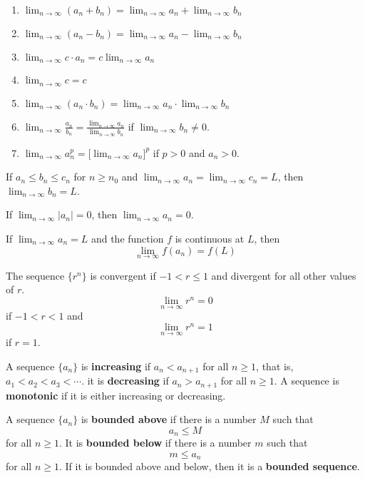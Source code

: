 \begin{enumerate}
    \item
    \(\displaystyle{\lim_{n\to\infty}(a_n+b_n)
    =\lim_{n\to\infty}a_n+\lim_{n\to\infty}b_n}\)
    \item
    \(\displaystyle{\lim_{n\to\infty}(a_n-b_n)
    =\lim_{n\to\infty}a_n-\lim_{n\to\infty}b_n}\)
    \item \(\displaystyle{\lim_{n\to\infty}c\cdot a_n=c\lim_{n\to\infty}a_n}\)
    \item \(\displaystyle{\lim_{n\to\infty}c=c}\)
    \item
    \(\displaystyle{\lim_{n\to\infty}(a_n\cdot b_n)
    =\lim_{n\to\infty}a_n\cdot\lim_{n\to\infty}b_n}\)
    \item
    \(\displaystyle{\lim_{n\to\infty}\frac{a_n}{b_n}
    =\frac{\displaystyle{\lim_{n\to\infty}a_n}}
    {\displaystyle{\lim_{n\to\infty}b_n}}}\)
    if \(\displaystyle{\lim_{n\to\infty}b_n\neq 0}\).
    \item
    \(\displaystyle{\lim_{n\to\infty}a_n^p=\big[\lim_{n\to\infty}a_n\big]^p}\)
    if \(p>0\) and \(a_n>0\).
\end{enumerate}
\begin{theorem}
    If \(a_n\leq b_n\leq c_n\) for \(n\geq n_0\) and
    \(\displaystyle{\lim_{n\to\infty}a_n=\lim_{n\to\infty}c_n}=L\), then
    \(\displaystyle{\lim_{n\to\infty}b_n=L}\).
\end{theorem}
\begin{theorem}
    If \(\displaystyle{\lim_{n\to\infty}|a_n|=0}\), then
    \(\displaystyle{\lim_{n\to\infty}a_n=0}\).
\end{theorem}
\begin{theorem}
    If \(\displaystyle{\lim_{n\to\infty}a_n=L}\) and the function \(f\) is
    continuous at \(L\), then
    \[\lim_{n\to\infty}f(a_n)=f(L)\]
\end{theorem}
The sequence \(\{r^n\}\) is convergent if \(-1<r\leq 1\) and divergent for all
other values of \(r\).
\[\lim_{n\to\infty}r^n=0\]
if \(-1<r<1\) and
\[\lim_{n\to\infty}r^n=1\]
if \(r=1\).
\begin{definition}
    A sequence \(\{a_n\}\) is \textbf{increasing} if \(a_n<a_{n+1}\) for all
    \(n\geq 1\), that is, \(a_1<a_2<a_3<\cdots\).
    it is \textbf{decreasing} if \(a_n>a_{n+1}\) for all \(n\geq 1\).
    A sequence is \textbf{monotonic} if it is either increasing or decreasing.
\end{definition}
\begin{definition}
    A sequence \(\{a_n\}\) is \textbf{bounded above} if there is a number
    \(M\) such that
    \[a_n\leq M\]
    for all \(n\geq 1\).
    It is \textbf{bounded below} if there is a number
    \(m\) such that
    \[m\leq a_n\]
    for all \(n\geq 1\).
    If it is bounded above and below, then it is a \textbf{bounded sequence}.
\end{definition}
